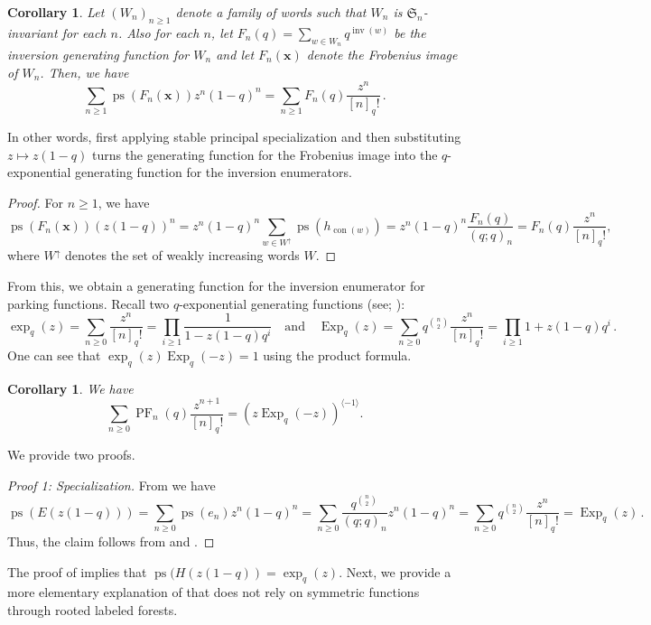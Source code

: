 \documentclass{amsart}
\renewcommand{\S}{\mathfrak{S}}
\newcommand{\eqpd}{\, .}
\DeclareMathOperator{\inv}{inv}
\DeclareMathOperator{\PF}{PF}
\DeclareMathOperator{\con}{con}
\DeclareMathOperator{\ps}{ps}
\DeclareMathOperator{\Exp}{Exp}
\newtheorem{corollary}[theorem]{Corollary}
\theoremstyle{definition}
\begin{document}
\begin{corollary}\label{cor:sym-to-q-exp-gen-funs}
    Let $(W_n)_{n\geq 1}$ denote a family of words such that $W_n$ is $\S_n$-invariant for each $n$. Also for each $n$, let $F_n(q)=\sum_{w\in W_n}q^{\inv(w)}$ be the inversion generating function for $W_n$ and let $F_n(\mathbf{x})$ denote the Frobenius image of $W_n$. Then, we have
    \[\sum_{n\geq 1}\ps(F_n(\mathbf{x}))z^n(1-q)^n=\sum_{n\geq 1}F_n(q)\frac{z^n}{[n]_q!} \eqpd
    \]
\end{corollary}
 In other words, first applying stable principal specialization and then substituting $z\mapsto z(1-q)$ turns the generating function for the Frobenius image into the $q$-exponential generating function for the inversion enumerators.
\begin{proof} 
For $n\geq 1$, we have 
    \[\ps(F_n(\mathbf{x}))(z(1-q))^n =z^n (1-q)^n \sum_{w\in W^{\uparrow}}\ps(h_{\con(w)})=z^n(1-q)^n \frac{F_n(q)}{(q;q)_n}=F_n(q)\frac{z^n}{[n]_q!}, 
    \]
where $W^\uparrow$ denotes the set of weakly increasing words $W$.
\end{proof}
From this, we obtain a generating function for the inversion enumerator for parking functions. Recall two $q$-exponential generating functions (see; \cite[Equations 1.85, 1.87]{stanley2012enumerative}): 
\[
\exp_q(z)=\sum_{n\geq 0}\frac{z^n}{[n]_q!}=\prod_{i\geq 1}\frac{1}{1-z(1-q)q^i}\quad\text{and}\quad \Exp_q(z)=\sum_{n\geq 0}q^{\binom{n}{2}}\frac{z^n}{[n]_q!}=\prod_{i\geq 1}1+z(1-q)q^i\eqpd
\]
One can see that $\exp_q(z)\Exp_q(-z)=1$ using the product formula.

\begin{corollary} \label{thm:PF-is-q-LambertW-Inverse} We have 
\[\sum_{n\geq 0}\PF_n(q)\frac{z^{n+1}}{[n]_{q}!}=(z\Exp_{q}(-z))^{\langle -1\rangle }.\]
\end{corollary}
We provide two proofs.
\begin{proof}[Proof 1: Specialization]
    From \cite[Proposition 7.8.3]{stanley1999enumerative} we have
    \[\ps(E(z(1-q)))=\sum_{n\geq 0} \ps(e_n) z^n(1-q)^n=\sum_{n\geq 0}\frac{q^{\binom{n}{2}}}{(q;q)_n}z^n (1-q)^n=\sum_{n\geq 0}q^{\binom{n}{2}}\frac{z^n}{[n]_q!}= \Exp_q(z) \eqpd
    \]
    Thus, the claim follows from  and .
\end{proof}
The proof of  implies that $\ps(H(z(1-q))=\exp_q(z)$.
Next, we provide a more elementary explanation of  that does not rely on symmetric functions through rooted labeled forests.
\end{document}
